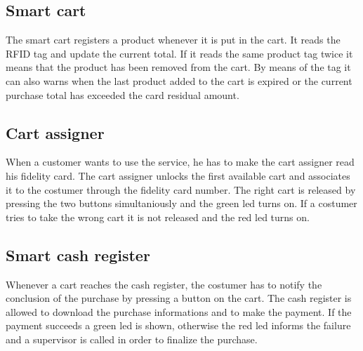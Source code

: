 \documentclass[a4paper,12pt]{article}
\begin{document}
\subsection{Smart cart}
The smart cart registers a product whenever it is put in the cart. It reads the RFID tag and update the current total. If it reads the same product tag twice it means that the product has been removed from the cart. By means of the tag it can also warns when the last product added to the cart is expired or the current purchase total has exceeded the card residual amount.

\subsection{Cart assigner}
When a customer wants to use the service, he has to make the cart assigner read his fidelity card. The cart assigner unlocks the first available cart and associates it to the costumer through the fidelity card number. The right cart is released by pressing the two buttons simultaniously and the green led turns on. If a costumer tries to take the wrong cart it is not released and the red led turns on.

\subsection{Smart cash register}
Whenever a cart reaches the cash register, the costumer has to notify the conclusion of the purchase by pressing a button on the cart. The cash register is allowed to download the purchase informations and to make the payment. If the payment succeeds a green led is shown, otherwise the red led informs the failure and a supervisor is called in order to finalize the purchase.
\end{document}
